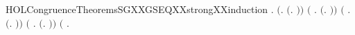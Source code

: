\begin{SaveVerbatim}{HOLCongruenceTheoremsSGXXGSEQXXstrongXXinduction}
\HOLTokenTurnstile{} \HOLSymConst{\HOLTokenForall{}}.
       \ensuremath{(}\HOLSymConst{\HOLTokenForall{}}.  \ensuremath{(}\HOLTokenLambda{}. \ensuremath{)}\ensuremath{)} \HOLSymConst{\HOLTokenConj{}} \ensuremath{(}\HOLSymConst{\HOLTokenForall{}} .   \HOLSymConst{\HOLTokenImp{}}  \ensuremath{(}\HOLTokenLambda{}.  \HOLSymConst{\ensuremath{\ldotp}} \ensuremath{)}\ensuremath{)} \HOLSymConst{\HOLTokenConj{}}
       \ensuremath{(}\HOLSymConst{\HOLTokenForall{}} .   \HOLSymConst{\HOLTokenConj{}}   \HOLSymConst{\HOLTokenConj{}}   \HOLSymConst{\HOLTokenImp{}}  \ensuremath{(}\HOLTokenLambda{}. \HOLSymConst{\ensuremath{\ldotp}} \ensuremath{)}\ensuremath{)} \HOLSymConst{\HOLTokenConj{}}
       \ensuremath{(}\HOLSymConst{\HOLTokenForall{}} .
              \HOLSymConst{\HOLTokenConj{}}   \HOLSymConst{\HOLTokenConj{}}   \HOLSymConst{\HOLTokenConj{}}   \HOLSymConst{\HOLTokenConj{}}   \HOLSymConst{\HOLTokenConj{}}   \HOLSymConst{\HOLTokenImp{}}
             \ensuremath{(}\HOLTokenLambda{}. \HOLConst{\ensuremath{\tau}}\HOLSymConst{\ensuremath{\ldotp}}  \HOLSymConst{\ensuremath{+}} \HOLConst{\ensuremath{\tau}}\HOLSymConst{\ensuremath{\ldotp}} \ensuremath{)}\ensuremath{)} \HOLSymConst{\HOLTokenConj{}}
       \ensuremath{(}\HOLSymConst{\HOLTokenForall{}}  .
              \HOLSymConst{\HOLTokenConj{}}   \HOLSymConst{\HOLTokenConj{}}   \HOLSymConst{\HOLTokenConj{}}   \HOLSymConst{\HOLTokenImp{}}

\end{SaveVerbatim}

